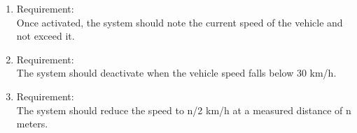 \begin{enumerate}[label*=\arabic*.]
        \item \label{req.11} Requirement: \\
        Once activated, the system should note the current speed of the vehicle and not exceed it. \\
        \item \label{req.12} Requirement: \\
        The system should deactivate when the vehicle speed falls below 30 km/h. \\
        \item \label{req.13} Requirement: \\
        The system should reduce the speed to n/2 km/h at a measured distance of n meters. \\
	 \end{enumerate}











